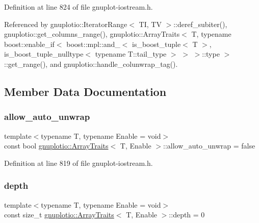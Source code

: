 Definition at line 824 of file gnuplot-\/iostream.\+h.



Referenced by gnuplotio\+::\+Iterator\+Range$<$ T\+I, T\+V $>$\+::deref\+\_\+subiter(), gnuplotio\+::get\+\_\+columns\+\_\+range(), gnuplotio\+::\+Array\+Traits$<$ T, typename boost\+::enable\+\_\+if$<$ boost\+::mpl\+::and\+\_\+$<$ is\+\_\+boost\+\_\+tuple$<$ T $>$, is\+\_\+boost\+\_\+tuple\+\_\+nulltype$<$ typename T\+::tail\+\_\+type $>$ $>$ $>$\+::type $>$\+::get\+\_\+range(), and gnuplotio\+::handle\+\_\+colunwrap\+\_\+tag().



\subsection{Member Data Documentation}
\mbox{\label{classgnuplotio_1_1_array_traits_a354d64663551a34c36c5fa7823859668}} 
\subsubsection{\texorpdfstring{allow\+\_\+auto\+\_\+unwrap}{allow\_auto\_unwrap}}
{\footnotesize\ttfamily template$<$typename T, typename Enable = void$>$ \\
const bool \hyperlink{classgnuplotio_1_1_array_traits}{gnuplotio\+::\+Array\+Traits}$<$ T, Enable $>$\+::allow\+\_\+auto\+\_\+unwrap = false\hspace{0.3cm}{\ttfamily [static]}}



Definition at line 819 of file gnuplot-\/iostream.\+h.

\mbox{\label{classgnuplotio_1_1_array_traits_a6fbd8c815e595f4efbcafd9b0eeb06f2}} 
\subsubsection{\texorpdfstring{depth}{depth}}
{\footnotesize\ttfamily template$<$typename T, typename Enable = void$>$ \\
const size\+\_\+t \hyperlink{classgnuplotio_1_1_array_traits}{gnuplotio\+::\+Array\+Traits}$<$ T, Enable $>$\+::depth = 0\hspace{0.3cm}{\ttfamily [static]}}



